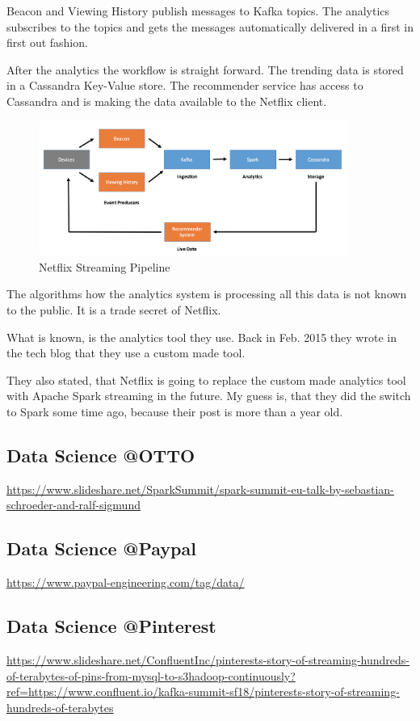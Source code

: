 \documentclass[12pt]{scrartcl} %
\begin{document}
Beacon and Viewing History publish messages to Kafka topics. The analytics subscribes to the topics and gets the messages automatically delivered in a first in first out fashion.

After the analytics the workflow is straight forward. The trending data is stored in a Cassandra Key-Value store. The recommender service has access to Cassandra and is making the data available to the Netflix client.

\begin{figure}[htbp]
  \centering
     \includegraphics[width=0.9\textwidth]{images/Netflix-Streaming-Pipeline}
  \caption{Netflix Streaming Pipeline}
  \label{fig:Bild1}
\end{figure}


The algorithms how the analytics system is processing all this data is not known to the public. It is a trade secret of Netflix.

What is known, is the analytics tool they use. Back in Feb. 2015 they wrote in the tech blog that they use a custom made tool.

They also stated, that Netflix is going to replace the custom made analytics tool with Apache Spark streaming in the future. My guess is, that they did the switch to Spark some time ago, because their post is more than a year old.

\subsection{Data Science @OTTO}
\url{https://www.slideshare.net/SparkSummit/spark-summit-eu-talk-by-sebastian-schroeder-and-ralf-sigmund}

\subsection{Data Science @Paypal}
\url{https://www.paypal-engineering.com/tag/data/}

\subsection{Data Science @Pinterest}
\url{https://www.slideshare.net/ConfluentInc/pinterests-story-of-streaming-hundreds-of-terabytes-of-pins-from-mysql-to-s3hadoop-continuously?ref=https://www.confluent.io/kafka-summit-sf18/pinterests-story-of-streaming-hundreds-of-terabytes}
\end{document}
